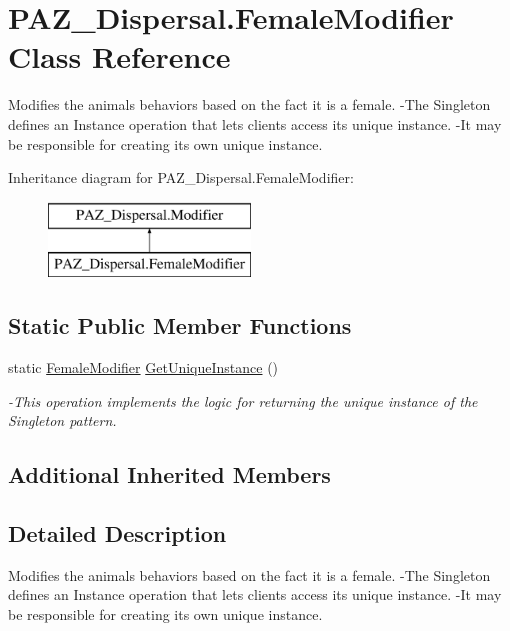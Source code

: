 \hypertarget{class_p_a_z___dispersal_1_1_female_modifier}{\section{P\-A\-Z\-\_\-\-Dispersal.\-Female\-Modifier Class Reference}
\label{class_p_a_z___dispersal_1_1_female_modifier}
}


Modifies the animals behaviors based on the fact it is a female. -\/\-The Singleton defines an Instance operation that lets clients access its unique instance. -\/\-It may be responsible for creating its own unique instance.  


Inheritance diagram for P\-A\-Z\-\_\-\-Dispersal.\-Female\-Modifier\-:\begin{figure}[H]
\begin{center}
\leavevmode
\includegraphics[height=2.000000cm]{class_p_a_z___dispersal_1_1_female_modifier}
\end{center}
\end{figure}
\subsection*{Static Public Member Functions}
\begin{DoxyCompactItemize}
\item 
static \hyperlink{class_p_a_z___dispersal_1_1_female_modifier}{Female\-Modifier} \hyperlink{class_p_a_z___dispersal_1_1_female_modifier_a0f3f1b7a0d9d145432e7dbe6ba237235}{Get\-Unique\-Instance} ()
\begin{DoxyCompactList}\small\item\em -\/\-This operation implements the logic for returning the unique instance of the Singleton pattern. \end{DoxyCompactList}\end{DoxyCompactItemize}
\subsection*{Additional Inherited Members}


\subsection{Detailed Description}
Modifies the animals behaviors based on the fact it is a female. -\/\-The Singleton defines an Instance operation that lets clients access its unique instance. -\/\-It may be responsible for creating its own unique instance. 



